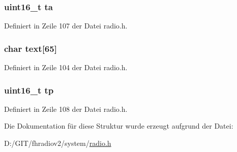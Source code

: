 \subsubsection[{ta}]{\setlength{\rightskip}{0pt plus 5cm}uint16\+\_\+t ta}\label{structradio__rds_aaa7c4cc5a934d489d475d0f7d26e437c}


Definiert in Zeile 107 der Datei radio.\+h.

\hypertarget{structradio__rds_a1d7cd4d36a6a2fa49631cef5d5847187}{}
\subsubsection[{text}]{\setlength{\rightskip}{0pt plus 5cm}char text\mbox{[}65\mbox{]}}\label{structradio__rds_a1d7cd4d36a6a2fa49631cef5d5847187}


Definiert in Zeile 104 der Datei radio.\+h.

\hypertarget{structradio__rds_a92aabb0ca71171ea02dd5cf0ada0d536}{}
\subsubsection[{tp}]{\setlength{\rightskip}{0pt plus 5cm}uint16\+\_\+t tp}\label{structradio__rds_a92aabb0ca71171ea02dd5cf0ada0d536}


Definiert in Zeile 108 der Datei radio.\+h.



Die Dokumentation für diese Struktur wurde erzeugt aufgrund der Datei\+:\begin{DoxyCompactItemize}
\item 
D\+:/\+G\+I\+T/fhradiov2/system/\hyperlink{radio_8h}{radio.\+h}\end{DoxyCompactItemize}

